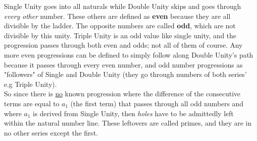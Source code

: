 \documentclass[12pt, letterpaper, twosided]{report}
\begin{document}
\noindent Single Unity goes into all naturals while Double Unity skips and goes through \textit{every other} number. These others are defined as \textbf{even} because they are all divisible by the ladder. The opposite numbers are called \textbf{odd}, which are not divisible by this unity.
Triple Unity is an odd value like single unity, and the progression passes through both even and odds; not all of them of course. Any more even progressions can be defined to simply follow along Double Unity's path because it passes through\hspace{0.15cm} every\hspace{0.15cm} even number, and odd number progressions as "followers" of Single and Double Unity (they go through numbers of both series' e.g Triple Unity).\\
So since there is \underline{no} known progression where the difference of the consecutive terms are equal to $a_1$ (the first term) that passes through all odd numbers and where $a_1$ is derived from Single Unity, then \textit{holes} have to be admittedly left within the natural number line. These leftovers are called primes, and they are in no other series except the first.
\end{document}
